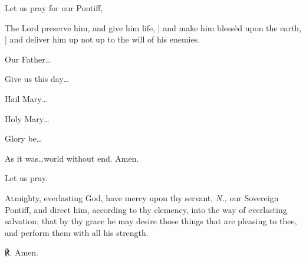 \begin{enpars}

 \vv Let us pray for our Pontiff, \nomen

 \rr The Lord preserve him, and give him life, | and make him blessèd upon the earth, | and deliver him up not up to the will of his enemies.

\vv Our Father…

\rr Give us this day…

\vv Hail Mary…

\rr Holy Mary…

\vv Glory be…

\rr As it was…world without end. Amen.



Let us pray.

\lettrine{A}{l}mighty, everlasting God, have mercy upon thy servant, \textit{N.,}  our Sovereign Pontiff, and direct him, according to thy clemency, into the way of everlasting salvation; that by thy grace he may desire those things that are pleasing to thee, and perform them with all his strength.

℟. Amen.


\end{enpars}